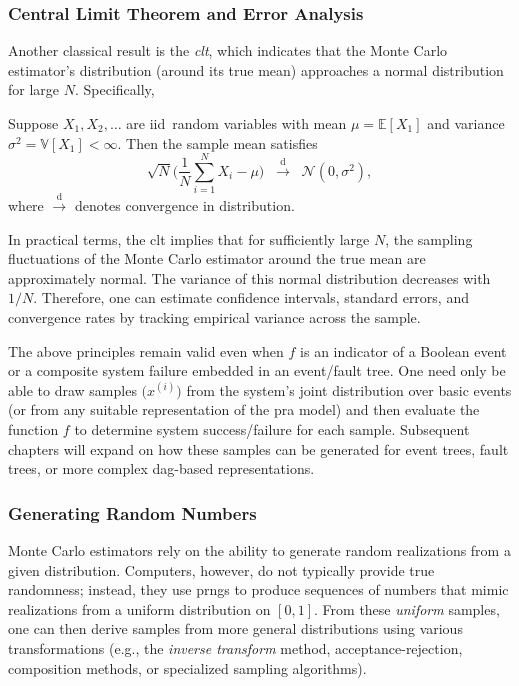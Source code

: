 \subsubsection{Central Limit Theorem and Error Analysis}
Another classical result is the \emph{\acrfull{clt}}, which indicates that the Monte Carlo estimator's distribution (around its true mean) approaches a normal distribution for large \(N\). Specifically,

\begin{theorem}
\label{thm:CLT}
Suppose \(X_1, X_2,\dots\) are \acrshort{iid}\ random variables with mean \(\mu=\mathbb{E}[X_1]\) and variance \(\sigma^2=\mathbb{V}[X_1]<\infty\). Then the sample mean satisfies
\[
\sqrt{N}
\biggl(
 \frac{1}{N}\sum_{i=1}^N X_i - \mu
\biggr)
\;\;\xrightarrow{\mathrm{d}}\;\;
\mathcal{N}(0,\sigma^2),
\]
where \(\xrightarrow{\mathrm{d}}\) denotes convergence in distribution.
\end{theorem}

In practical terms, the \acrfull{clt} implies that for sufficiently large \(N\), the sampling fluctuations of the Monte Carlo estimator around the true mean are approximately normal. The variance of this normal distribution decreases with \(1/N\). Therefore, one can estimate confidence intervals, standard errors, and convergence rates by tracking empirical variance across the sample.

The above principles remain valid even when \(f\) is an indicator of a Boolean event or a composite system failure embedded in an event/fault tree. One need only be able to draw samples \(\bigl(x^{(i)}\bigr)\) from the system's joint distribution over basic events (or from any suitable representation of the \acrshort{pra} model) and then evaluate the function \(f\) to determine system success/failure for each sample. Subsequent chapters will expand on how these samples can be generated for event trees, fault trees, or more complex \acrshort{dag}-based representations.

\subsubsection{Generating Random Numbers}
Monte Carlo estimators rely on the ability to generate random realizations from a given distribution. Computers, however, do not typically provide true randomness; instead, they use \acrfull{prng}s to produce sequences of numbers that mimic realizations from a uniform distribution on \([0,1]\). From these \emph{uniform} samples, one can then derive samples from more general distributions using various transformations (e.g., the \emph{inverse transform} method, acceptance-rejection, composition methods, or specialized sampling algorithms).

